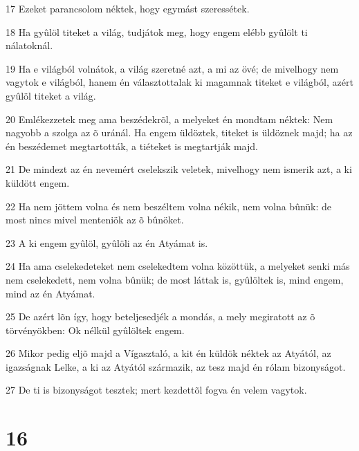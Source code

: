\par 17 Ezeket parancsolom néktek, hogy egymást szeressétek.
\par 18 Ha gyûlöl titeket a világ, tudjátok meg, hogy engem elébb gyûlölt ti nálatoknál.
\par 19 Ha e világból volnátok, a világ szeretné azt, a mi az övé; de mivelhogy nem vagytok e világból, hanem én választottalak ki magamnak titeket e világból, azért gyûlöl titeket a világ.
\par 20 Emlékezzetek meg ama beszédekrõl, a melyeket én mondtam néktek: Nem nagyobb a szolga az õ uránál. Ha engem üldöztek, titeket is üldöznek majd; ha az én beszédemet megtartották, a tiéteket is megtartják majd.
\par 21 De mindezt az én nevemért cselekszik veletek, mivelhogy nem ismerik azt, a ki küldött engem.
\par 22 Ha nem jöttem volna és nem beszéltem volna nékik, nem volna bûnük: de most nincs mivel menteniök az õ bûnöket.
\par 23 A ki engem gyûlöl, gyûlöli az én Atyámat is.
\par 24 Ha ama cselekedeteket nem cselekedtem volna közöttük, a melyeket senki más nem cselekedett, nem volna bûnük; de most láttak is, gyûlöltek is, mind engem, mind az én Atyámat.
\par 25 De azért lõn így, hogy beteljesedjék a mondás, a mely megiratott az õ törvényökben: Ok nélkül gyûlöltek engem.
\par 26 Mikor pedig eljõ majd a Vígasztaló, a kit én küldök néktek az Atyától, az igazságnak Lelke, a ki az Atyától származik, az tesz majd én rólam bizonyságot.
\par 27 De ti is bizonyságot tesztek; mert kezdettõl fogva én velem vagytok.

\chapter{16}

